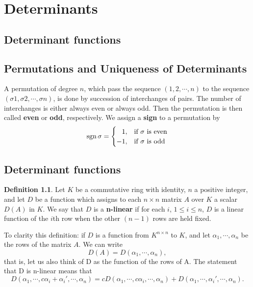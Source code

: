 \documentclass{book}
\theoremstyle{remark}
\theoremstyle{definition}
\newtheorem{definition}{Definition}[section]
\newcommand{\sgn}{\text{sgn\,}}
\begin{document}
\chapter{Determinants}
\section{Determinant functions}

\section{Permutations and Uniqueness of Determinants}
A permutation of degree $n$, which pass the sequence $(1, 2, \cdots, n)$ to the sequence $(\sigma 1, \sigma 2, \cdots, \sigma n )$, is done by succession of interchanges of pairs. The number of interchanges is either always even or always odd. Then the permutation is then called \textbf{even} or \textbf{odd}, respectively. 
We assign a \textbf{sign} to a permutation by
\begin{equation}
    \sgn \sigma = \begin{cases}
     \hphantom{-}1, & \text{if } \sigma \text{ is even} \\
    -1, & \text{if } \sigma \text{ is odd} 
    \end{cases}
\end{equation}

\section{Determinant functions}
\begin{definition}
Let $K$ be a commutative ring with identity, $n$ a positive integer, and let $D$ be a function which assigns to each $n \times n$ matrix $A$ over $K$ a scalar $D(A)$ in $K$. We say that $D$ is a \textbf{n-linear} if for each $i$, $1 \leq i \leq n$, $D$ is a linear function of the $i$th row when the other $(n - 1)$ rows are held fixed. 
\end{definition}

To clarity this definition: if $D$ is a function from $K^{n \times n}$ to $K$, and let $\alpha_1, \cdots, \alpha_n$ be the rows of the matrix $A$. We can write 
\begin{equation*}
    D(A) = D(\alpha_1, \cdots, \alpha_n),
\end{equation*}
that is, let us also think of D as the function of the rows of A. The statement that D is n-linear means that
\begin{equation}\label{n-linear_function}
    D(\alpha_1,\cdots, c\alpha_i + \alpha_i', \cdots, \alpha_n) = cD(\alpha_1,\cdots, c\alpha_i, \cdots, \alpha_n) + D(\alpha_1,\cdots, \alpha_i', \cdots, \alpha_n). 
\end{equation}
\end{document}
